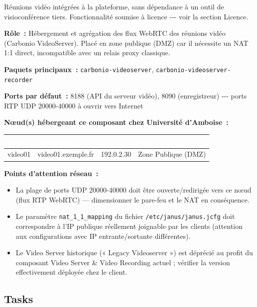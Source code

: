 \documentclass[11pt,a4paper]{report}
\newcommand{\tblhead}[1]{\textcolor{white}{\textbf{#1}}}
\begin{document}
Réunions vidéo intégrées à la plateforme, sans dépendance à un outil de visioconférence tiers.\allowbreak{} Fonctionnalité soumise à licence -\allowbreak{}-\allowbreak{}-\allowbreak{} voir la section Licence.\allowbreak{}

\textbf{Rôle~:} Hébergement et agrégation des flux WebRTC des réunions vidéo (Carbonio VideoServer).\allowbreak{} Placé en zone publique (DMZ) car il nécessite un NAT 1:1 direct, incompatible avec un relais proxy classique.\allowbreak{}

\textbf{Paquets principaux~:} \texttt{carbonio-\allowbreak{}videoserver}, \texttt{carbonio-\allowbreak{}videoserver-\allowbreak{}recorder}

\textbf{Ports par défaut~:} 8188 (API du serveur vidéo), 8090 (enregistreur) -\allowbreak{}-\allowbreak{}-\allowbreak{} ports RTP UDP 20000-\allowbreak{}40000 à ouvrir vers Internet

\textbf{Nœud(s) hébergeant ce composant chez Université d'Amboise~:}
\begin{longtable}{|p{3.2cm}|p{4.5cm}|p{3.2cm}|p{2.3cm}|}
\hline
\rowcolor{primary}\tblhead{Nœud} & \tblhead{Hostname} & \tblhead{IP} & \tblhead{Zone} \\
\hline
\endhead
video01 & video01.\allowbreak{}exemple.\allowbreak{}fr & 192.\allowbreak{}0.\allowbreak{}2.\allowbreak{}30 & Zone Publique (DMZ) \\
\hline
\end{longtable}

\textbf{Points d'attention réseau~:}
\begin{itemize}[nosep]
  \item La plage de ports UDP 20000-40000 doit être ouverte/redirigée vers ce nœud (flux RTP WebRTC) --- dimensionner le pare-feu et le NAT en conséquence.
  \item Le paramètre \texttt{nat\_1\_1\_mapping} du fichier \texttt{/etc/janus/janus.jcfg} doit correspondre à l'IP publique réellement joignable par les clients (attention aux configurations avec IP entrante/sortante différentes).
  \item Le Video Server historique (« Legacy Videoserver ») est déprécié au profit du composant Video Server \& Video Recording actuel ; vérifier la version effectivement déployée chez le client.
\end{itemize}

\subsection{Tasks}
\end{document}
